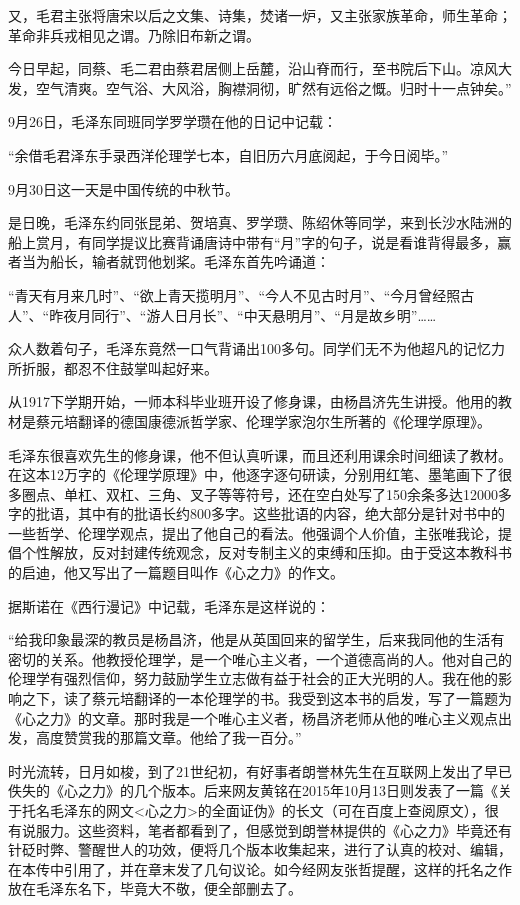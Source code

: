 \documentclass[../../dazhuan.tex]{subfiles}
\begin{document}
又，毛君主张将唐宋以后之文集、诗集，焚诸一炉，又主张家族革命，师生革命；革命非兵戎相见之谓。乃除旧布新之谓。

今日早起，同蔡、毛二君由蔡君居侧上岳麓，沿山脊而行，至书院后下山。凉风大发，空气清爽。空气浴、大风浴，胸襟洞彻，旷然有远俗之慨。归时十一点钟矣。” 

9月26日，毛泽东同班同学罗学瓒在他的日记中记载：

“余借毛君泽东手录西洋伦理学七本，自旧历六月底阅起，于今日阅毕。”

9月30日这一天是中国传统的中秋节。

是日晚，毛泽东约同张昆弟、贺培真、罗学瓒、陈绍休等同学，来到长沙水陆洲的船上赏月，有同学提议比赛背诵唐诗中带有“月”字的句子，说是看谁背得最多，赢者当为船长，输者就罚他划桨。毛泽东首先吟诵道：

“青天有月来几时”、“欲上青天揽明月”、“今人不见古时月”、“今月曾经照古人”、“昨夜月同行”、“游人日月长”、“中天悬明月”、“月是故乡明”……

众人数着句子，毛泽东竟然一口气背诵出100多句。同学们无不为他超凡的记忆力所折服，都忍不住鼓掌叫起好来。

从1917下学期开始，一师本科毕业班开设了修身课，由杨昌济先生讲授。他用的教材是蔡元培翻译的德国康德派哲学家、伦理学家泡尔生所著的《伦理学原理》。

毛泽东很喜欢先生的修身课，他不但认真听课，而且还利用课余时间细读了教材。在这本12万字的《伦理学原理》中，他逐字逐句研读，分别用红笔、墨笔画下了很多圈点、单杠、双杠、三角、叉子等等符号，还在空白处写了150余条多达12000多字的批语，其中有的批语长约800多字。这些批语的内容，绝大部分是针对书中的一些哲学、伦理学观点，提出了他自己的看法。他强调个人价值，主张唯我论，提倡个性解放，反对封建传统观念，反对专制主义的束缚和压抑。由于受这本教科书的启迪，他又写出了一篇题目叫作《心之力》的作文。

据斯诺在《西行漫记》中记载，毛泽东是这样说的：

“给我印象最深的教员是杨昌济，他是从英国回来的留学生，后来我同他的生活有密切的关系。他教授伦理学，是一个唯心主义者，一个道德高尚的人。他对自己的伦理学有强烈信仰，努力鼓励学生立志做有益于社会的正大光明的人。我在他的影响之下，读了蔡元培翻译的一本伦理学的书。我受到这本书的启发，写了一篇题为《心之力》的文章。那时我是一个唯心主义者，杨昌济老师从他的唯心主义观点出发，高度赞赏我的那篇文章。他给了我一百分。”

时光流转，日月如梭，到了21世纪初，有好事者朗誉林先生在互联网上发出了早已佚失的《心之力》的几个版本。后来网友黄铭在2015年10月13日则发表了一篇《关于托名毛泽东的网文<心之力>的全面证伪》的长文（可在百度上查阅原文），很有说服力。这些资料，笔者都看到了，但感觉到朗誉林提供的《心之力》毕竟还有针砭时弊、警醒世人的功效，便将几个版本收集起来，进行了认真的校对、编辑，在本传中引用了，并在章末发了几句议论。如今经网友张哲提醒，这样的托名之作放在毛泽东名下，毕竟大不敬，便全部删去了。
\end{document}
